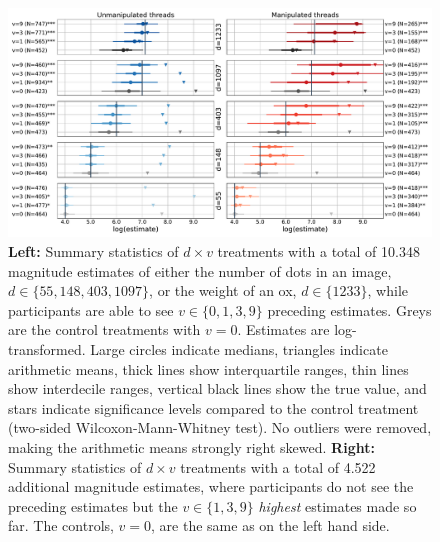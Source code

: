 \documentclass[10pt,a4paper,twocolumn,lineno]{article}
\begin{document}
\begin{figure}[!ht]
\centering
\includegraphics[width=1\linewidth]{../plots/fig1max.pdf}
\caption{\small \textbf{Left:} Summary statistics of $d \times v$ treatments with a total of 10.348 magnitude estimates of either the number of dots in an image, $d \in \{55,148,403,1097\}$, or the weight of an ox, $d \in \{1233\}$, while participants are able to see $v \in \{0,1,3,9\}$ preceding estimates. Greys are the control treatments with $v=0$. Estimates are log-transformed. Large circles indicate medians, triangles indicate arithmetic means, thick lines show interquartile ranges, thin lines show interdecile ranges, vertical black lines show the true value, and stars indicate significance levels compared to the control treatment (two-sided Wilcoxon-Mann-Whitney test). No outliers were removed, making the arithmetic means strongly right skewed. \textbf{Right:} Summary statistics of $d \times v$ treatments with a total of 4.522 additional magnitude estimates, where participants do not see the preceding estimates but the $v \in \{1,3,9\}$ \textit{highest} estimates made so far. The controls, $v=0$, are the same as on the left hand side.}\label{fig:1}
\end{figure}
\end{document}

